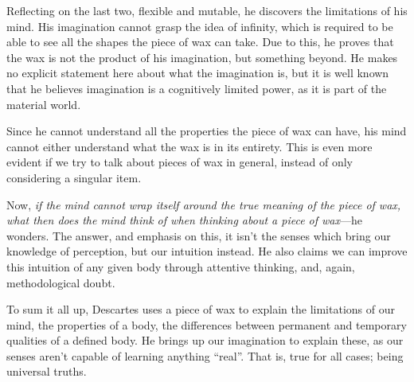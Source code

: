 \documentclass{assignment}
\begin{document}
\begin{answer}
Reflecting on the last two, flexible and mutable, he discovers the limitations of his mind. His imagination cannot grasp the idea of infinity, which is required to be able to see all the shapes the piece of wax can take. Due to this, he proves that the wax is not the product of his imagination, but something beyond. He makes no explicit statement here about what the imagination is, but it is well known \autocite{limitedimagination} that he believes imagination is a cognitively limited power, as it is part of the material world.

Since he cannot understand all the properties the piece of wax can have, his mind cannot either understand what the wax is in its entirety. This is even more evident if we try to talk about pieces of wax in general, instead of only considering a singular item.

Now, \emph{if the mind cannot wrap itself around the true meaning of the piece of wax, what then does the mind think of when thinking about a piece of wax}---he wonders. The answer, and emphasis on this, it isn’t the senses which bring our knowledge of perception, but our intuition instead. He also claims we can improve this intuition of any given body through attentive thinking, and, again, methodological doubt.

\vspace*{1\baselineskip}
To sum it all up, Descartes uses a piece of wax to explain the limitations of our mind, the properties of a body, the differences between permanent and temporary qualities of a defined body. He brings up our imagination to explain these, as our senses aren’t capable of learning anything “real”. That is, true for all cases; being universal truths.
\end{answer}

\printbibliography
\end{document}
